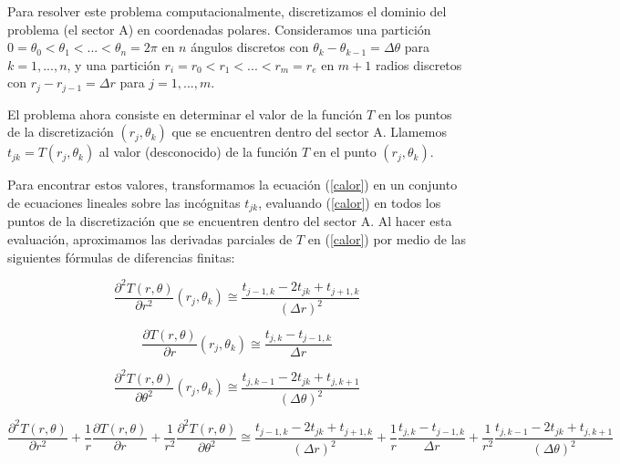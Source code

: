\medskip

Para resolver este problema computacionalmente, discretizamos el dominio del problema (el sector A) en coordenadas polares. Consideramos una partici\'on $0 = \theta_0 < \theta_1 < ... < \theta_n = 2\pi$ en $n$ \'angulos discretos con $\theta_k-\theta_{k-1} = \Delta\theta$ para $k = 1,...,n$, y una partici\'on $r_i = r_0 < r_1 < ... < r_m = r_e$ en $m+1$ radios discretos con $r_j - r_{j-1} = \Delta r$ para $j = 1,...,m$.

\medskip

El problema ahora consiste en determinar el valor de la funci\'on $T$ en los puntos de la discretizaci\'on $(r_j,\theta_k)$ que se encuentren dentro del sector A. Llamemos $t_{jk} = T(r_j,\theta_k)$ al valor (desconocido) de la funci\'on $T$ en el punto $(r_j,\theta_k)$.

\medskip

Para encontrar estos valores, transformamos la ecuaci\'on (\ref{calor}) en un conjunto de ecuaciones lineales sobre las inc\'ognitas $t_{jk}$, evaluando (\ref{calor}) en todos los puntos de la discretizaci\'on que se encuentren dentro del sector A. Al hacer esta evaluaci\'on, aproximamos las derivadas parciales de $T$ en (\ref{calor}) por medio de las siguientes f\'ormulas de diferencias finitas:


\begin{equation}
\frac{\partial^2T(r,\theta)}{\partial r^2}(r_j,\theta_k) \cong \frac{t_{j-1,k}-2t_{jk}+t_{j+1,k}}{(\Delta r)^2}
\end{equation}

\begin{equation}
\frac{\partial T(r,\theta)}{\partial r}(r_j,\theta_k) \cong \frac{t_{j,k}-t_{j-1,k}}{\Delta r}
\end{equation}

\begin{equation}
\frac{\partial^2T(r,\theta)}{\partial \theta^2}(r_j,\theta_k) \cong \frac{t_{j,k-1}-2t_{jk}+t_{j,k+1}}{(\Delta \theta)^2}
\end{equation}

\begin{equation}\label{5}
\frac{\partial^2T(r,\theta)}{\partial r^2}+\frac{1}{r}\frac{\partial T(r,\theta)}{\partial r}+\frac{1}{r^2}\frac{\partial^2T(r,\theta)}{\partial \theta^2} \cong \frac{t_{j-1,k}-2t_{jk}+t_{j+1,k}}{(\Delta r)^2} + \frac{1}{r}\frac{t_{j,k}-t_{j-1,k}}{\Delta r} + \frac{1}{r^2}\frac{t_{j,k-1}-2t_{jk}+t_{j,k+1}}{(\Delta \theta)^2}
\end{equation}

